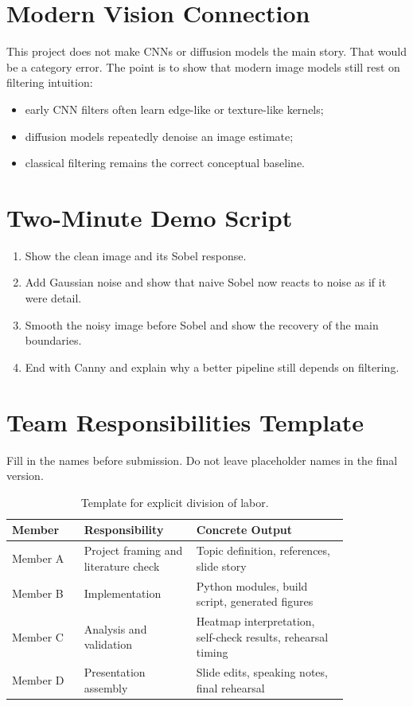 \documentclass[11pt]{article}
\begin{document}
\section{Modern Vision Connection}
This project does not make CNNs or diffusion models the main story. That would be a category error. The point is to show that modern image models still rest on filtering intuition:
\begin{itemize}[leftmargin=1.4em]
  \item early CNN filters often learn edge-like or texture-like kernels;
  \item diffusion models repeatedly denoise an image estimate;
  \item classical filtering remains the correct conceptual baseline.
\end{itemize}

\section{Two-Minute Demo Script}
\begin{enumerate}[leftmargin=1.4em]
  \item Show the clean image and its Sobel response.
  \item Add Gaussian noise and show that naive Sobel now reacts to noise as if it were detail.
  \item Smooth the noisy image before Sobel and show the recovery of the main boundaries.
  \item End with Canny and explain why a better pipeline still depends on filtering.
\end{enumerate}

\section{Team Responsibilities Template}
Fill in the names before submission. Do not leave placeholder names in the final version.

\begin{table}[H]
  \centering
  \renewcommand{\arraystretch}{1.2}
  \begin{tabular}{p{0.18\linewidth} p{0.28\linewidth} p{0.38\linewidth}}
    \toprule
    Member & Responsibility & Concrete Output \\
    \midrule
    Member A & Project framing and literature check & Topic definition, references, slide story \\
    Member B & Implementation & Python modules, build script, generated figures \\
    Member C & Analysis and validation & Heatmap interpretation, self-check results, rehearsal timing \\
    Member D & Presentation assembly & Slide edits, speaking notes, final rehearsal \\
    \bottomrule
  \end{tabular}
  \caption{Template for explicit division of labor.}
\end{table}
\end{document}
